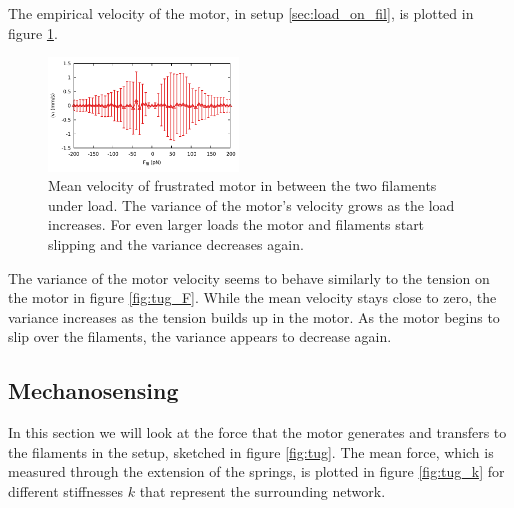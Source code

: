 \documentclass[aps,pre,twocolumn,showpacs,showkeys,superscriptaddress,floatfix]{revtex4-1}
\begin{document}
The empirical velocity of the motor, in setup \ref{sec:load_on_fil}, is plotted in figure \ref{fig:tug_F_motor}. 

\begin{figure}[t]
\centering
\includegraphics[width=0.45\textwidth,height=!]{tug_F_motor}
\caption{
\label{fig:tug_F_motor}
Mean velocity of frustrated motor in between the two filaments under load. The variance of the motor's velocity grows as the load increases. For even larger loads the motor and filaments start slipping and the variance decreases again.
}
\end{figure}

The variance of the motor velocity seems to behave similarly to the tension on the motor in figure \ref{fig:tug_F}. While the mean velocity stays close to zero, the variance increases as the tension builds up in the motor. As the motor begins to slip over the filaments, the variance appears to decrease again.


\subsection{Mechanosensing}
\label{sec:mechanosensing}
In this section we will look at the force that the motor generates and transfers to the filaments in the setup, sketched in figure \ref{fig:tug}. 
The mean force, which is measured through the extension of the springs, is plotted in figure \ref{fig:tug_k} for different stiffnesses $k$ that represent the surrounding network.
\end{document}
